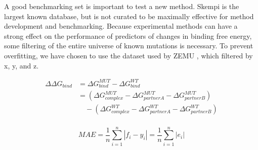 \documentclass{article}
\begin{document}
A good benchmarking set is important to test a new method. Skempi \cite{moal_skempi:_2012} is the largest known database, but is not curated to be maximally effective for method development and benchmarking. Because experimental methods can have a strong effect on the performance of predictors of changes in binding free energy\cite{geng_exploring_2016}, some filtering of the entire universe of known mutations is necessary. To prevent overfitting, we have chosen to use the dataset used by ZEMU \cite{dourado_multiscale_2014}, which filtered by x, y, and z.

\begin{equation}\label{split-ddg-equation}
  \begin{split}
    {\Delta\Delta}G_{bind} & ={\Delta}G^{MUT}_{bind} - {\Delta}G^{WT}_{bind}\\
    & =({\Delta}G^{MUT}_{complex} - {\Delta}G^{MUT}_{partner A} - {\Delta}G^{MUT}_{partner B})\\
    & \quad - ({\Delta}G^{WT}_{complex} - {\Delta}G^{WT}_{partner A} - {\Delta}G^{WT}_{partner B})\\
  \end{split}
\end{equation}

\begin{equation}\label{MAE-equation}
  MAE = \dfrac{1}{n}\sum\limits_{i=1}^n|f_i-y_i| = \dfrac{1}{n}\sum\limits_{i=1}^n|e_i|
\end{equation}



\end{document}
